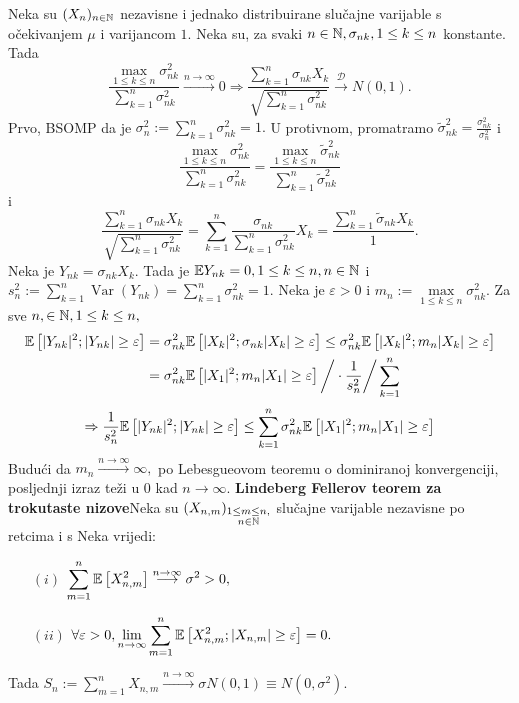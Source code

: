 \documentclass{article}
\newcommand{\Var}{\operatorname{Var}}
\begin{document}
Neka su \((X_n)_{n\in\Bbb N}\) nezavisne i jednako distribuirane slučajne varijable s očekivanjem \(\mu\) i varijancom \(1.\) Neka su, za svaki \(n\in\Bbb N,\sigma_{nk},1\le k\le n\) konstante. Tada \[\dfrac{\max_{1\le k\le n}\sigma_{nk}^2}{\sum_{k=1}^n\sigma_{nk}^2}\overset{n\to\infty}{\longrightarrow}0\Rightarrow\frac{\sum_{k=1}^n\sigma_{nk}X_k}{\sqrt{\sum_{k=1}^n\sigma_{nk}^2}}\overset{\mathcal D}{\longrightarrow}N(0,1).\] Prvo, BSOMP da je \(\sigma_n^2:=\sum_{k=1}^n\sigma_{nk}^2=1.\) U protivnom, promatramo \(\tilde\sigma_{nk}^2=\frac{\sigma_{nk}^2}{\sigma_n^2}\) i \[\frac{\max\limits_{1\le k\le n}\sigma_{nk}^2}{\sum_{k=1}^n\sigma_{nk}^2}=\frac{\max\limits_{1\le k\le n}\tilde\sigma_{nk}^2}{\sum_{k=1}^n\tilde\sigma_{nk}^2}\] i \[\frac{\sum_{k=1}^n\sigma_{nk}X_k}{\sqrt{\sum_{k=1}^n\sigma_{nk}^2}}=\sum_{k=1}^n\frac{\sigma_{nk}}{\sum_{k=1}^n\sigma_{nk}^2}X_k=\frac{\sum_{k=1}^n\tilde\sigma_{nk}X_k}1.\] Neka je \(Y_{nk}=\sigma_{nk}X_k.\) Tada je \(\Bbb EY_{nk}=0,1\le k\le n,n\in\Bbb N\) i \(s_n^2:=\sum_{k=1}^n\Var(Y_{nk})=\sum_{k=1}^n\sigma_{nk}^2=1.\) Neka je \(\varepsilon>0\) i \(m_n:=\max\limits_{1\le k\le n}\sigma_{nk}^2.\) Za sve \(n,\in\Bbb N,1\le k\le n,\) \[\begin{aligned}\Bbb E\left[|Y_{nk}|^2;|Y_{nk}|\ge\varepsilon\right]&=\sigma_{nk}^2\Bbb E\left[|X_k|^2;\sigma_{nk}|X_k|\ge\varepsilon\right]\le\sigma_{nk}^2\Bbb E\left[|X_k|^2;m_n|X_k|\ge\varepsilon\right]\\&=\sigma_{nk}^2\Bbb E\left[|X_1|^2;m_n|X_1|\ge\varepsilon\right]\bigg/\cdot\frac1{s_n^2}\bigg/\sum_{k=1}^n\end{aligned}\]  \[\Rightarrow\frac1{s_n^2}\Bbb E\left[|Y_{nk}|^2;|Y_{nk}|\ge\varepsilon\right]\le\sum_{k=1}^n\sigma_{nk}^2\Bbb E\left[|X_1|^2;m_n|X_1|\ge\varepsilon\right]\] Budući da \(m_n\overset{n\to\infty}{\longrightarrow}\infty,\) po Lebesgueovom teoremu o dominiranoj konvergenciji, posljednji izraz teži u \(0\) kad \(n\to\infty.\)\newline\newline
\textbf{Lindeberg Fellerov teorem za trokutaste nizove}\newline Neka su \((X_{n,m})_{\substack{1\le m\le n,\\n\in\Bbb N}}\) slučajne varijable nezavisne po retcima i s  Neka vrijedi:
\begin{enumerate}
    \item[\((i)\)] \(\displaystyle\sum_{m=1}^n\Bbb E\left[X_{n,m}^2\right]\overset{n\to\infty}{\longrightarrow}\sigma^2>0,\) 
    \item[\((ii)\)] \(\displaystyle\forall\varepsilon>0,\lim_{n\to\infty}\sum_{m=1}^n\Bbb E\left[X_{n,m}^2;|X_{n,m}|\ge\varepsilon\right]=0.\) 
\end{enumerate} Tada \(\displaystyle S_n:=\sum_{m=1}^nX_{n,m}\overset{n\to\infty}{\longrightarrow}\sigma N(0,1)\equiv N(0,\sigma^2).\)\newline\newline
\end{document}
